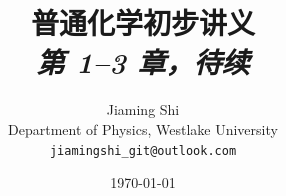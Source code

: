 \documentclass[chinese]{chemistry}
\begin{document}
\title{普通化学初步讲义\\[0.5em]
       \large\textit{第 1--3 章，待续}}

\author{Jiaming Shi\\[0.3em]
        \small Department of Physics, Westlake University\\
        \small\texttt{jiamingshi\_git@outlook.com}}

\date{\today}
\maketitle

\tableofcontents








\end{document}
